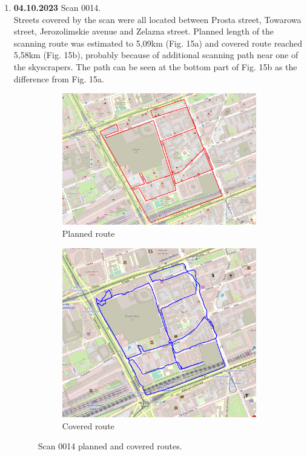 \documentclass[a4paper,12pt]{book}
\begin{document}
\begin{enumerate}
	\item \textbf{04.10.2023} Scan 0014. \\
	Streets covered by the scan were all located between Prosta street, Towarowa street, Jerozolimskie avenue and Zelazna street. Planned length of the scanning route was estimated to 5,09km (Fig. 15a) and covered route reached 5,58km (Fig. 15b), probably because of additional scanning path near one of the skyscrapers. The path can be seen at the bottom part of Fig. 15b as the difference from Fig. 15a.
	\begin{figure}[H]
		\centering
		\begin{subfigure}{.90\textwidth}
			\centering
			\includegraphics[width=1\linewidth]{route_p14}
			\caption{Planned route}
			\label{fig:a14}
		\end{subfigure}%
		\linebreak
		\begin{subfigure}{.90\textwidth}
			\centering
			\includegraphics[width=1\linewidth]{route_c14}
			\caption{Covered route}
			\label{fig:b14}
		\end{subfigure}
		\caption{Scan 0014 planned and covered routes.}
		\label{fig:fig14}
	\end{figure} 
	\pagebreak
	

\end{enumerate}
\end{document}
